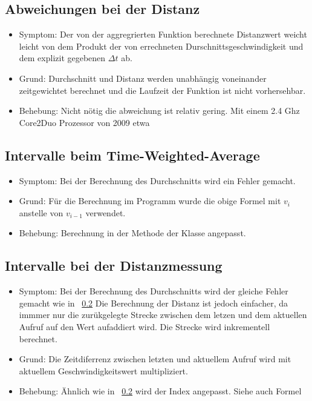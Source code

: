 \documentclass[qualitaetssicherung.tex]{subfiles}
\begin{document}
	\subsection{Abweichungen bei der Distanz} \label{DDIST}
		\begin{itemize}
			\item
			Symptom: Der von der aggregrierten Funktion  berechnete Distanzwert weicht leicht von dem Produkt der von  errechneten Durschnittsgeschwindigkeit und dem explizit gegebenen $\Delta t$ ab.
			\item
			Grund: Durchschnitt und Distanz werden unabhängig voneinander zeitgewichtet berechnet und die Laufzeit der Funktion ist nicht vorhersehbar.
			\item
			Behebung: Nicht nötig die abweichung ist relativ gering. Mit einem 2.4 Ghz Core2Duo Prozessor von 2009 etwa 

		\end{itemize}

	\subsection{Intervalle beim Time-Weighted-Average} \label{TWA}
		\begin{itemize}
			\item
			Symptom: Bei der Berechnung des Durchschnitts wird ein Fehler gemacht.
			\item
			Grund: Für die Berechnung im Programm wurde die obige Formel mit $v_i$ anstelle von $v_{i-1}$ verwendet.
			\item
			Behebung: Berechnung in der Methode  der Klasse  angepasst.

		\end{itemize}

	\subsection{Intervalle bei der Distanzmessung} \label{VGL}
		\begin{itemize}
			\item
			Symptom: Bei der Berechnung des Durchschnitts wird der gleiche Fehler gemacht wie in ~\ref{TWA} Die Berechnung der Distanz ist jedoch einfacher, da immmer nur die zurükgelegte Strecke zwischen dem letzen und dem aktuellen Aufruf auf den Wert aufaddiert wird. Die Strecke wird inkrementell berechnet.
			\item
			Grund: Die Zeitdiferrenz zwischen letzten und aktuellem Aufruf wird mit aktuellem Geschwindigkeitswert multipliziert.
			\item
			Behebung: Ähnlich wie in ~\ref{TWA} wird der Index angepasst. Siehe auch Formel

		\end{itemize}
\end{document}
